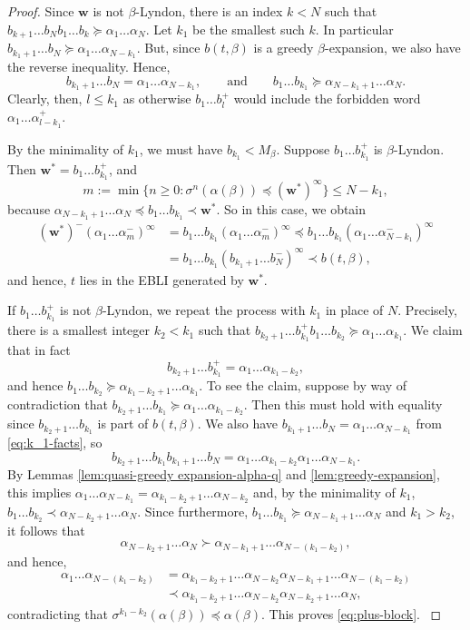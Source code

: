 \documentclass[11pt]{amsart}
\theoremstyle{definition}
\theoremstyle{remark}
\numberwithin{equation}{section}
\newcommand{\w}{\mathbf{w}}
\newcommand{\f}{\infty}
\newcommand{\al}{\alpha}
\newcommand{\lle}{\preccurlyeq}
\newcommand{\lge}{\succcurlyeq}
\newcommand{\si}{\sigma}
\begin{document}
\begin{proof}
Since $\w$ is not $\beta$-Lyndon, there is an index $k<N$ such that $b_{k+1}\dots b_N b_1\dots b_k\lge\al_1\dots \al_N$. Let $k_1$ be the smallest such $k$. In particular $b_{k_1+1}\dots b_N\lge \al_1\dots\al_{N-k_1}$. But, since $b(t,\beta)$ is a greedy $\beta$-expansion, we also have the reverse inequality. Hence,
\begin{equation} \label{eq:k_1-facts}
b_{k_1+1}\dots b_N=\al_1\dots\al_{N-k_1}, \qquad\mbox{and} \qquad b_1\dots b_{k_1}\lge\al_{N-k_1+1}\dots\al_N.
\end{equation}
Clearly, then, $l\leq k_1$ as otherwise $b_1\dots b_l^+$ would include the forbidden word $\al_1\dots\al_{l-k_1}^+$.

{By the minimality of $k_1$, we must have $b_{k_1}{<M_\beta}$.}
Suppose $b_1\dots b_{k_1}^+$ is $\beta$-Lyndon. Then $\w^*=b_1\dots b_{k_1}^+$, and 
\[
m:=\min\{n\geq 0: \si^n(\al(\beta))\lle (\w^*)^\f\}\leq N-k_1, 
\]
because $\al_{N-k_1+1}\dots\al_N\lle b_1\dots b_{k_1}\prec \w^*$. So in this case, we obtain
\begin{align*}
(\w^*)^-(\al_1\dots\al_m^-)^\f &=b_1\dots b_{k_1}(\al_1\dots\al_m^-)^\f \lle b_1\dots b_{k_1}(\al_1\dots\al_{N-k_1}^-)^\f\\
&=b_1\dots b_{k_1}(b_{k_1+1}\dots b_N^-)^\f\prec b(t,\beta),
\end{align*}
and hence, $t$ lies in the EBLI generated by $\w^*$.

If $b_1\dots b_{k_1}^+$ is not $\beta$-Lyndon, we repeat the process with $k_1$ in place of $N$. Precisely, there is a smallest integer $k_2<k_1$ such that $b_{k_2+1}\dots b_{k_1}^+b_1\dots b_{k_2}\lge \al_1\dots\al_{k_1}$. We claim that in fact
\begin{equation} \label{eq:plus-block}
b_{k_2+1}\dots b_{k_1}^+=\al_1\dots\al_{k_1-k_2},
\end{equation}
and hence $b_1\dots b_{k_2}\lge \al_{k_1-k_2+1}\dots \al_{k_1}$. To see the claim, suppose by way of contradiction that $b_{k_2+1}\dots b_{k_1}\lge \al_1\dots\al_{k_1-k_2}$. Then this must hold with equality since $b_{k_2+1}\dots b_{k_1}$ is part of $b(t,\beta)$. {We also have $b_{k_1+1}\dots b_N=\al_1\dots\al_{N-k_1}$ from \eqref{eq:k_1-facts}, so
\[
b_{k_2+1}\dots b_{k_1}b_{k_1+1}\dots b_N=\al_1\dots\al_{k_1-k_2}\al_1\dots\al_{N-k_1}.
\]
By Lemmas \ref{lem:quasi-greedy expansion-alpha-q} and \ref{lem:greedy-expansion}, this implies $\al_1\dots\al_{N-k_1}=\al_{k_1-k_2+1}\dots\al_{N-k_2}$ and, by the minimality of $k_1$, $b_1\dots b_{k_2}\prec \al_{N-k_2+1}\dots\al_N$. Since furthermore, $b_1\dots b_{k_1}\lge\al_{N-k_1+1}\dots\al_N$ and $k_1>k_2$, it follows that
\[
\al_{N-k_2+1}\dots\al_N\succ \al_{N-k_1+1}\dots\al_{N-(k_1-k_2)},
\]
and hence,
\begin{align*}
\al_1\dots\al_{N-(k_1-k_2)}&=\al_{k_1-k_2+1}\dots\al_{N-k_2}\al_{N-k_1+1}\dots\al_{N-(k_1-k_2)}\\
&\prec \al_{k_1-k_2+1}\dots\al_{N-k_2}\al_{N-k_2+1}\dots\al_N,
\end{align*}
contradicting that $\si^{k_1-k_2}(\al(\beta))\lle \al(\beta)$. This proves \eqref{eq:plus-block}.
}


\end{proof}
\end{document}
